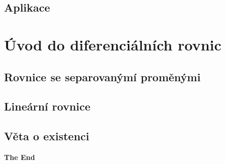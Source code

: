 \documentclass[11pt]{article}
\theoremstyle{nontheoremstyle}
\theoremstyle{nontheoremstylenodot}
\theoremstyle{theoremstyle}
\begin{document}
\subsection{Aplikace}

\section{Úvod do diferenciálních rovnic}
\subsection{Rovnice se separovanýmí proměnými}
\subsection{Lineární rovnice}
\subsection{Věta o existenci}

\vfill
\begin{center}
\LARGE
\textbf{The End}
\end{center}
\end{document}
